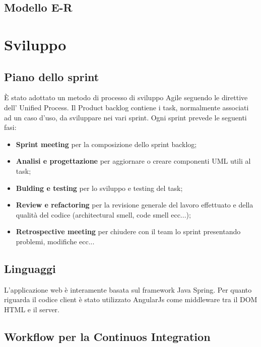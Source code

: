 \documentclass[12pt]{article}
\begin{document}
\subsection{Modello E-R}
\section{Sviluppo}
\subsection{Piano dello sprint}
\`{E} stato adottato un metodo di processo di sviluppo Agile seguendo le direttive dell' Unified Process. Il Product backlog contiene i task, normalmente associati ad un caso d'uso,  da sviluppare nei vari sprint. Ogni sprint prevede le seguenti fasi:
\begin{itemize}
\item {\textbf {Sprint meeting}} per la composizione dello sprint backlog;
\item {\textbf {Analisi e progettazione}}  per aggiornare o creare componenti UML utili al task;
\item {\textbf {Bulding e testing}}  per lo sviluppo e testing del task;
\item {\textbf {Review e refactoring}} per la revisione generale del lavoro effettuato e della qualità del codice (architectural smell, code smell ecc...);
\item {\textbf {Retrospective meeting}} per chiudere con il team lo sprint presentando problemi, modifiche ecc...
\end{itemize}
\subsection{Linguaggi}
L'applicazione web è interamente basata sul framework Java Spring. Per quanto riguarda il codice client è stato utilizzato AngularJs come middleware tra il DOM HTML e il server.
\subsection{Workflow per la Continuos Integration}


\end{document}
